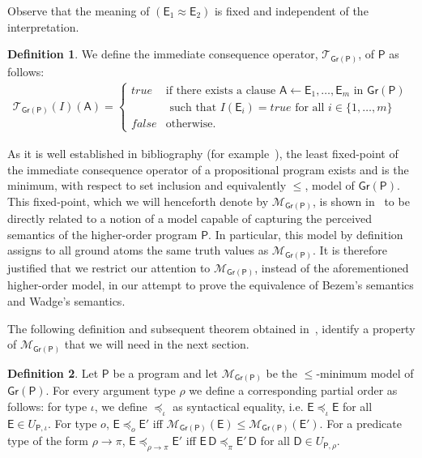 \documentclass[submission,copyright]{eptcs}
\theoremstyle{definition}
\newtheorem{definition}{Definition}
\newcommand{\bezem}{\mathcal{M}_\mathsf{Gr(P)}}
\newcommand{\bezemTP}{\mathcal{T}_\mathsf{Gr(P)}}
\begin{document}
Observe that the meaning of $(\mathsf{E}_1 \approx \mathsf{E}_2)$ is fixed and independent of the interpretation.

\begin{definition}
We define the immediate consequence operator, $\bezemTP$, of $\mathsf{P}$ as follows:
\begin{align*}
\bezemTP(I)(\mathsf{A}) = \begin{cases}
 \mathit{true} & \mbox{if there exists a clause } \mathsf{A} \leftarrow \mathsf{E}_1, \ldots, \mathsf{E}_m \mbox{ in } \mathsf{Gr(P)} \\
 & \mbox{ such that } I(\mathsf{E}_i) =true \mbox{ for all } i \in \{1, \ldots, m\} \\
 \mathit{false} & \mbox{otherwise}.
\end{cases}
\end{align*}
\end{definition}

As it is well established in bibliography (for example~\cite{lloyd}), the least fixed-point of the immediate consequence operator of a propositional program exists and is the minimum, with respect to
set inclusion and equivalently $\leq$, model of $\mathsf{Gr(P)}$. This fixed-point, which we will henceforth denote by $\bezem$, is shown in~\cite{Bezem99,Bezem01} to be directly related to a notion of a model capable of capturing the perceived semantics of the higher-order program $\mathsf{P}$. In particular, this model by definition assigns to all ground atoms the same truth values as $\bezem$. It is therefore justified that we restrict our attention to $\bezem$, instead of the aforementioned higher-order model, in our attempt to prove the equivalence of Bezem's semantics and Wadge's semantics.



The following definition and subsequent theorem obtained in~\cite{Bezem2002},
identify a property of $\bezem$ that we will need in the next section.
\begin{definition}
Let $\mathsf{P}$ be a program and let $\bezem$ be the $\leq$-minimum model of $\mathsf{Gr(P)}$.
For every argument type $\rho$ we define a corresponding partial order as follows: for type $\iota$, we define
$\preceq_\iota$ as syntactical equality, i.e. $\mathsf{E} \preceq_\iota \mathsf{E}$ for all $\mathsf{E} \in U_{\mathsf{P},\iota}$.
For type $o$, $\mathsf{E} \preceq_o \mathsf{E'}$ iff $\bezem(\mathsf{E}) \leq \bezem(\mathsf{E'})$. For a predicate type of
the form $\rho \rightarrow \pi$, $\mathsf{E} \preceq_{\rho \rightarrow \pi} \mathsf{E'}$ iff
$\mathsf{E} \, \mathsf{D} \preceq_{\pi} \mathsf{E'} \, \mathsf{D}$ for all $\mathsf{D} \in U_{\mathsf{P},\rho}$.
\end{definition}
\end{document}
